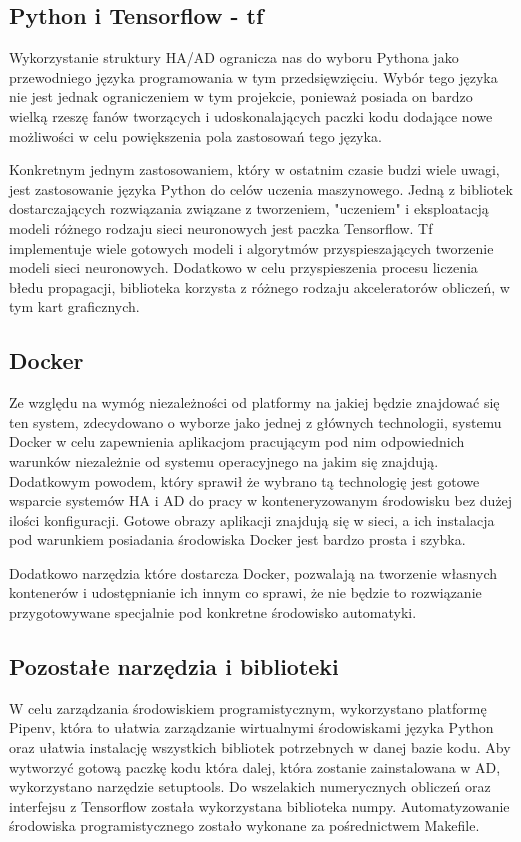 \subsection{Python i Tensorflow - tf}
Wykorzystanie struktury HA/AD ogranicza nas do wyboru Pythona jako przewodniego języka programowania w tym przedsięwzięciu. Wybór tego języka nie jest jednak ograniczeniem w tym projekcie, ponieważ posiada on bardzo wielką rzeszę fanów tworzących i udoskonalających paczki kodu dodające nowe możliwości w celu powiększenia pola zastosowań tego języka.

Konkretnym jednym zastosowaniem, który w ostatnim czasie budzi wiele uwagi, jest zastosowanie języka Python do celów uczenia maszynowego. Jedną z bibliotek dostarczających rozwiązania związane z tworzeniem, "uczeniem" i eksploatacją modeli różnego rodzaju sieci neuronowych jest paczka Tensorflow. Tf implementuje wiele gotowych modeli i algorytmów przyspieszających tworzenie modeli sieci neuronowych. Dodatkowo w celu przyspieszenia procesu liczenia błedu propagacji, biblioteka korzysta z różnego rodzaju akceleratorów obliczeń, w tym kart graficznych.

\subsection{Docker}
Ze względu na wymóg niezależności od platformy na jakiej będzie znajdować się ten system, zdecydowano o wyborze jako jednej z głównych technologii, systemu Docker w celu zapewnienia aplikacjom pracującym pod nim odpowiednich warunków niezależnie od systemu operacyjnego na jakim się znajdują. Dodatkowym powodem, który sprawił że wybrano tą technologię jest gotowe wsparcie systemów HA i AD do pracy w konteneryzowanym środowisku bez dużej ilości konfiguracji. Gotowe obrazy aplikacji znajdują się w sieci, a ich instalacja pod warunkiem posiadania środowiska Docker jest bardzo prosta i szybka.

Dodatkowo narzędzia które dostarcza Docker, pozwalają na tworzenie własnych kontenerów i udostępnianie ich innym co sprawi, że nie będzie to rozwiązanie przygotowywane specjalnie pod konkretne środowisko automatyki.

\subsection{Pozostałe narzędzia i biblioteki}
W celu zarządzania środowiskiem programistycznym, wykorzystano platformę Pipenv, która to ułatwia zarządzanie wirtualnymi środowiskami języka Python oraz ułatwia instalację wszystkich bibliotek potrzebnych w danej bazie kodu. Aby wytworzyć gotową paczkę kodu która dalej, która zostanie zainstalowana w AD, wykorzystano narzędzie setuptools. Do wszelakich numerycznych obliczeń oraz interfejsu z Tensorflow została wykorzystana biblioteka numpy. Automatyzowanie środowiska programistycznego zostało wykonane za pośrednictwem Makefile.


